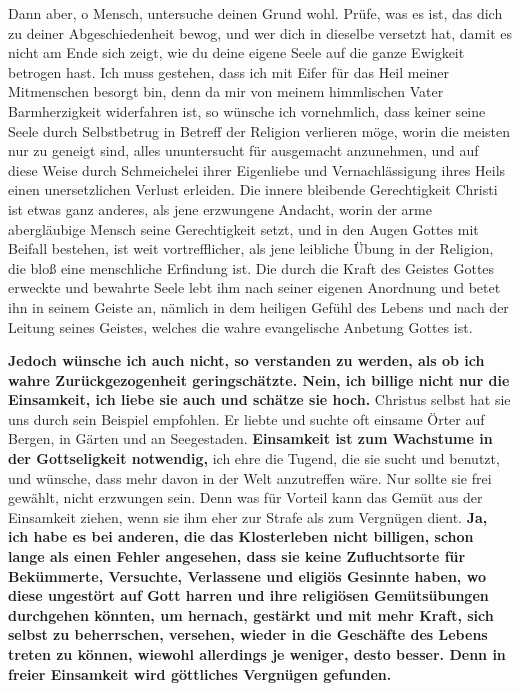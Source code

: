 Dann aber, o Mensch, untersuche deinen Grund wohl. Prüfe, was es ist, das dich
zu deiner Abgeschiedenheit bewog, und wer dich in dieselbe versetzt hat, damit
es nicht am Ende sich zeigt, wie du deine eigene Seele auf die ganze Ewigkeit
betrogen hast. Ich muss gestehen, dass ich mit Eifer für das Heil meiner
Mitmenschen besorgt bin, denn da mir von meinem himmlischen Vater
Barmherzigkeit widerfahren ist, so wünsche ich vornehmlich, dass keiner seine
Seele durch Selbstbetrug in Betreff der Religion verlieren möge, worin die
meisten nur zu geneigt sind, alles ununtersucht für ausgemacht anzunehmen, und
auf diese Weise durch Schmeichelei ihrer Eigenliebe und Vernachlässigung ihres
Heils einen unersetzlichen Verlust erleiden. Die innere bleibende Gerechtigkeit
Christi ist etwas ganz anderes, als jene erzwungene Andacht, worin der arme
abergläubige Mensch seine Gerechtigkeit setzt, und in den Augen Gottes mit
Beifall bestehen, ist weit vortrefflicher, als jene leibliche Übung in der
Religion, die bloß eine menschliche Erfindung ist. Die durch die Kraft des
Geistes Gottes erweckte und bewahrte Seele lebt ihm nach seiner eigenen
Anordnung und betet ihn in seinem Geiste an, nämlich in dem heiligen Gefühl
des Lebens und nach der Leitung seines Geistes, welches die wahre evangelische
Anbetung Gottes ist.

\medskip

 \textbf{Jedoch wünsche ich auch nicht, so verstanden zu werden, als ob ich wahre
Zurückgezogenheit geringschätzte. Nein, ich billige nicht nur die Einsamkeit,
ich liebe sie auch und schätze sie hoch.} Christus selbst hat sie uns durch
sein Beispiel empfohlen. Er liebte und suchte oft einsame Örter auf Bergen, in
Gärten und an Seegestaden. \textbf{Einsamkeit ist zum Wachstume in der Gottseligkeit
notwendig,} ich ehre die Tugend, die sie sucht und benutzt, und wünsche, dass
mehr davon in der Welt anzutreffen wäre. Nur sollte sie frei gewählt, nicht
erzwungen sein. Denn was für Vorteil kann das Gemüt aus der Einsamkeit ziehen,
wenn sie ihm eher zur Strafe als zum Vergnügen dient. \textbf{Ja, ich habe es
bei
anderen, die das Klosterleben  nicht billigen, schon lange als einen Fehler
angesehen, dass sie keine Zufluchtsorte  für Bekümmerte, Versuchte, Verlassene
und eligiös Gesinnte haben, wo diese ungestört auf Gott harren und ihre
religiösen Gemütsübungen durchgehen könnten, um hernach, gestärkt und mit mehr
Kraft, sich selbst zu beherrschen, versehen, wieder in die Geschäfte des Lebens
treten zu können, wiewohl allerdings je weniger, desto besser. Denn in freier
Einsamkeit wird göttliches Vergnügen gefunden.}
\label{ref:05_13_zurueckgezogenheit_ende}